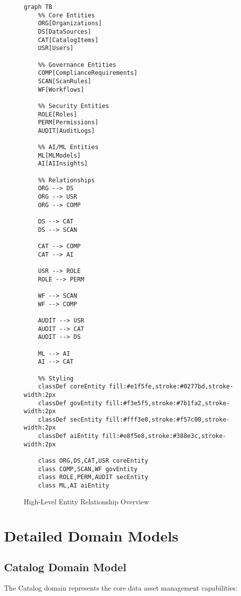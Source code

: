 \documentclass[12pt,a4paper]{article}
\begin{document}
\begin{figure}[H]
\centering
\begin{verbatim}
graph TB
    %% Core Entities
    ORG[Organizations]
    DS[DataSources]
    CAT[CatalogItems]
    USR[Users]
    
    %% Governance Entities
    COMP[ComplianceRequirements]
    SCAN[ScanRules]
    WF[Workflows]
    
    %% Security Entities
    ROLE[Roles]
    PERM[Permissions]
    AUDIT[AuditLogs]
    
    %% AI/ML Entities
    ML[MLModels]
    AI[AIInsights]
    
    %% Relationships
    ORG --> DS
    ORG --> USR
    ORG --> COMP
    
    DS --> CAT
    DS --> SCAN
    
    CAT --> COMP
    CAT --> AI
    
    USR --> ROLE
    ROLE --> PERM
    
    WF --> SCAN
    WF --> COMP
    
    AUDIT --> USR
    AUDIT --> CAT
    AUDIT --> DS
    
    ML --> AI
    AI --> CAT
    
    %% Styling
    classDef coreEntity fill:#e1f5fe,stroke:#0277bd,stroke-width:2px
    classDef govEntity fill:#f3e5f5,stroke:#7b1fa2,stroke-width:2px
    classDef secEntity fill:#fff3e0,stroke:#f57c00,stroke-width:2px
    classDef aiEntity fill:#e8f5e8,stroke:#388e3c,stroke-width:2px
    
    class ORG,DS,CAT,USR coreEntity
    class COMP,SCAN,WF govEntity
    class ROLE,PERM,AUDIT secEntity
    class ML,AI aiEntity
\end{verbatim}
\caption{High-Level Entity Relationship Overview}
\end{figure}

\section{Detailed Domain Models}

\subsection{Catalog Domain Model}

The Catalog domain represents the core data asset management capabilities:
\end{document}
